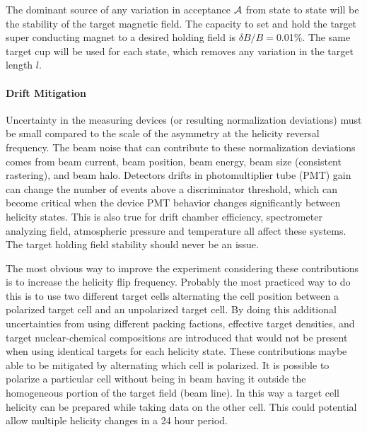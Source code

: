 The dominant source of any variation in acceptance ${\cal A}$ from state to state will be the stability of the target magnetic field.
The capacity to set and hold the target super conducting magnet
to a desired holding field is $\delta B /B=$0.01\%.  The same target cup will be used
for each state, which removes any variation in the target length $l$. 

\paragraph{Drift Mitigation}\mbox{}

Uncertainty in the measuring devices (or resulting normalization deviations) must be small compared to the
scale of the asymmetry at the helicity reversal frequency.  The beam noise that can contribute to these
normalization deviations comes from beam current, beam position, beam energy, beam size (consistent rastering), and beam halo.  Detectors drifts in photomultiplier tube (PMT) gain can change the number of events above
a discriminator threshold, which can become critical when the device PMT behavior changes significantly between
helicity states.  This is also true for drift chamber efficiency, spectrometer analyzing field,
atmospheric pressure and temperature all affect these systems.
The target holding field stability should never be an issue.%

The most obvious way to improve the experiment considering these contributions is to increase the helicity flip frequency.
Probably the most practiced way to do this is to use two different target cells alternating the cell position between a
polarized target cell and an unpolarized target cell.  By doing this additional uncertainties from using different packing factions,
effective target densities, and target nuclear-chemical compositions are introduced that would not be present when using identical targets for each helicity state.
These contributions maybe able to be mitigated by alternating which cell is polarized.  It is possible to polarize a particular cell
without being in beam having it outside the homogeneous portion of the target field (beam line).  In this way a target cell helicity can be
prepared while taking data on the other cell.  This could potential allow multiple helicity changes in a 24 hour period.

